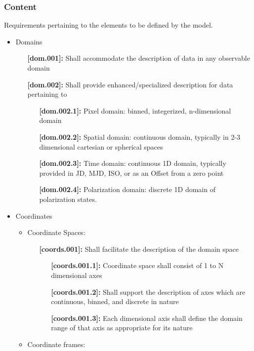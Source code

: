 \documentclass[11pt,a4paper]{ivoa}
\begin{document}
\subsubsection{Content}
Requirements pertaining to the elements to be defined by the model.
\begin{itemize}
  \item Domains
  \begin{itemize}
    \item [\textbf{[dom.001]:}] Shall accommodate the description of data in any observable domain
    \item [\textbf{[dom.002]:}] Shall provide enhanced/specialized description for data pertaining to
    \begin{itemize}
      \item [\textbf{[dom.002.1]:}] Pixel domain: binned, integerized, n-dimensional domain
      \item [\textbf{[dom.002.2]:}] Spatial domain: continuous domain, typically in 2-3 dimensional cartesian or spherical spaces
      \item [\textbf{[dom.002.3]:}] Time domain: continuous 1D domain, typically provided in JD, MJD, ISO, or as an Offset from a zero point
      \item [\textbf{[dom.002.4]:}] Polarization domain: discrete 1D domain of polarization states. 
    \end{itemize}
  \end{itemize}
  \item Coordinates
  \begin{itemize}
    \item Coordinate Spaces:
    \begin{itemize}
      \item [\textbf{[coords.001]:}] Shall facilitate the description of the domain space
      \begin{itemize}
        \item [\textbf{[coords.001.1]:}] Coordinate space shall consist of 1 to N dimensional axes
        \item [\textbf{[coords.001.2]:}] Shall support the description of axes which are continuous, binned, and discrete in nature
        \item [\textbf{[coords.001.3]:}] Each dimensional axis shall define the domain range of that axis as appropriate for its nature
      \end{itemize}
    \end{itemize}
    \item Coordinate frames: 

\end{itemize}
\end{itemize}
\end{document}
